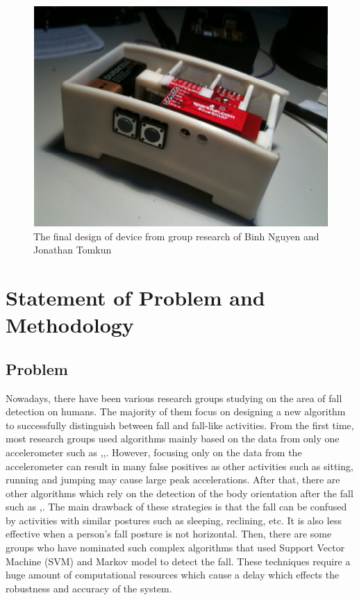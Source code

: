 \documentclass[letterpaper,12pt,titlepage,oneside,final]{book}
\begin{document}
 \begin{figure}[h!]
	\centering
	\includegraphics[scale=0.7]{binhnguyen_device}
	\caption{The final design of device from group research of Binh Nguyen and Jonathan Tomkun\cite{binh}}
\end{figure}  

\chapter{Statement of Problem and Methodology}

\section{Problem}
Nowadays, there have been various research groups studying on the area of fall detection on humans. The majority of them focus on designing a new algorithm to successfully distinguish between fall and fall-like activities. From the first time, most research groups used algorithms mainly based on the data from only one accelerometer such as \cite{only_accel_1},\cite{only_accel_2},\cite{only_accel_3}. However, focusing only on the data from the accelerometer can result in many false positives as other activities such as sitting, running and jumping may cause large peak accelerations. After that, there are other algorithms which rely on the detection of the body orientation after the fall such as \cite{body_orientation_1},\cite{body_orientation_2}. The main drawback of these strategies is that the fall can be confused by activities with similar postures such as sleeping, reclining, etc. It is also less effective when a person's fall posture is not horizontal. Then, there are some groups who have nominated such complex algorithms that used Support Vector Machine (SVM)\cite{SVM} and Markov model \cite{markov} to detect the fall. These techniques require a huge amount of computational resources which cause a delay which effects the robustness and accuracy of the system. 	
\end{document}
